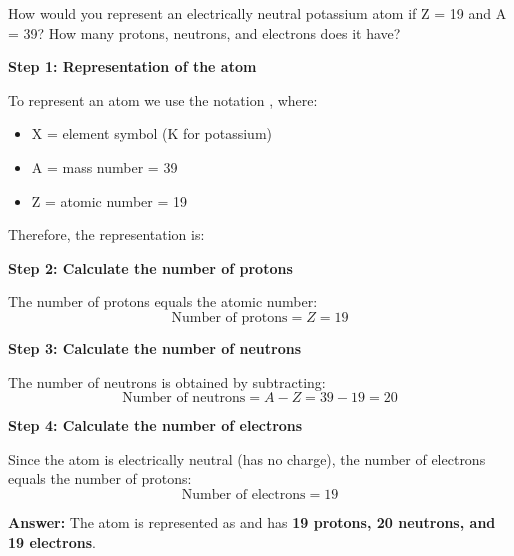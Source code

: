 \begin{exercise}
    How would you represent an electrically neutral potassium atom if Z = 19 and A = 39? How many protons, neutrons, and electrons does it have?
    \begin{solu}
        \textbf{Step 1: Representation of the atom}

        To represent an atom we use the notation , where:
        \begin{itemize}
            \item X = element symbol (K for potassium)
            \item A = mass number = 39
            \item Z = atomic number = 19
        \end{itemize}

        Therefore, the representation is: 

        \textbf{Step 2: Calculate the number of protons}

        The number of protons equals the atomic number:
        \[
            \text{Number of protons} = Z = 19
        \]

        \textbf{Step 3: Calculate the number of neutrons}

        The number of neutrons is obtained by subtracting:
        \[
            \text{Number of neutrons} = A - Z = 39 - 19 = 20
        \]

        \textbf{Step 4: Calculate the number of electrons}

        Since the atom is electrically neutral (has no charge), the number of electrons equals the number of protons:
        \[
            \text{Number of electrons} = 19
        \]

        \textbf{Answer:} The atom is represented as  and has \textbf{19 protons, 20 neutrons, and 19 electrons}.
    \end{solu}
\end{exercise}

